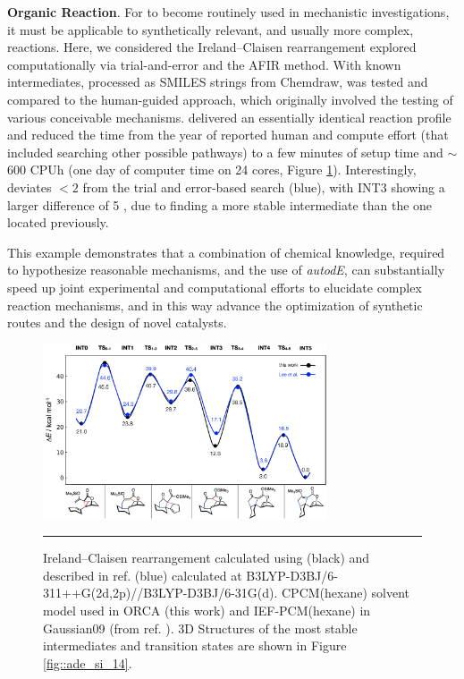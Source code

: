 \documentclass[../../main.tex]{subfiles}
\begin{document}
{\bfseries{Organic Reaction}}. For \ade to become routinely used in mechanistic investigations, it must be applicable to synthetically relevant, and usually more complex, reactions. Here, we considered the Ireland--Claisen rearrangement explored computationally via trial-and-error and the AFIR method.\cite{Lee2019} With known intermediates, processed as SMILES strings from Chemdraw\texttrademark, \ade was tested and compared to the human-guided approach, which originally involved the testing of various conceivable mechanisms. \ade delivered an essentially identical reaction profile and reduced the time from the year of reported human and compute effort (that included searching other possible pathways) to a few minutes of setup time and $\sim$600 CPUh (one day of computer time on 24 cores, Figure \ref{fig::ade_7}). Interestingly, \ade deviates $< 2$ \kcalx from the trial and error-based search (blue), with INT3 showing a larger difference of 5 \kcal, due to \ade finding a more stable intermediate than the one located previously.

This example demonstrates that a combination of chemical knowledge, required to hypothesize reasonable mechanisms, and the use of \emph{autodE}, can substantially speed up joint experimental and computational efforts to elucidate complex reaction mechanisms, and in this way advance the optimization of synthetic routes and the design of novel catalysts.


\begin{figure}
	
	\vspace{0.2cm}
	\centering
	\includegraphics[width=0.75\textwidth]{5/autode/figs/fig7}
	\vspace{0.2cm}
	\hrule
	\caption{Ireland--Claisen rearrangement calculated using \ade (black) and described in ref. \cite{Lee2019} (blue) calculated at B3LYP-D3BJ/6-311++G(2d,2p)//B3LYP-D3BJ/6-31G(d). CPCM(hexane) solvent model used in ORCA (this work) and IEF-PCM(hexane) in Gaussian09 (from ref. \cite{Lee2019}). 3D Structures of the most stable intermediates and transition states are shown in Figure \ref{fig::ade_si_14}.}
	\label{fig::ade_7}
	
\end{figure}
\end{document}
